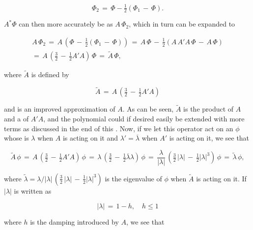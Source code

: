 \begin{equation}
\Phi_2 \,=\, \Phi - \tfrac{1}{2}(\Phi_1 \,-\, \Phi).
\end{equation}

$A^*\Phi$ can then more accurately be \approximated as $A\,\Phi_2$, which in turn can be expanded to

\begin{equation}
\begin{array}{c}
A\,\Phi_2 \,=\, A\,\left(\Phi \,-\, \tfrac{1}{2}(\Phi_1 \,-\, \Phi)\right) \,=\, A\,\Phi \,-\, \tfrac{1}{2}(A\,A'A\,\Phi \,-\, A\,\Phi) \\
=\, A\,\left(\tfrac{3}{2} \,-\, \tfrac{1}{2}A'A\right)\,\Phi \,=\, \tilde{A}\,\Phi,
\end{array}
\end{equation}

where $\tilde{A}$ is defined by

\begin{equation} \label{eq:compensated_advection_operator}
\tilde{A} \,=\, A\,\left(\tfrac{3}{2} \,-\, \tfrac{1}{2}A'A\right)
\end{equation}
 
and is an improved approximation of $A$. As can be seen, $\tilde{A}$ is the product of $A$ and a \polynomial of $A'A$, and the polynomial could if desired easily be extended with more terms as discussed in the end of this \levelname. Now, if we let this operator act on an \eigenfunction $\phi$ whose \eigenvalue is $\lambda$ when $A$ is acting on it and $\lambda' = \overline{\lambda}$ when $A'$ is acting on it, we see that 

\begin{equation}
\tilde{A}\,\phi \,=\, A\,\left(\tfrac{3}{2} \,-\, \tfrac{1}{2}A'A\right)\,\phi \,=\, \lambda\,\left(\tfrac{3}{2} \,-\, \tfrac{1}{2}\overline{\lambda}\lambda\right)\,\phi \,=\, \frac{\lambda}{|\lambda|}\,\left(\tfrac{3}{2}\,|\lambda| \,-\, \tfrac{1}{2}|\lambda|^3\right)\,\phi \,=\, \tilde{\lambda}\,\phi,
\end{equation}

where $\tilde{\lambda} = \lambda/|\lambda|\,\left(\tfrac{3}{2}\,|\lambda| \,-\, \tfrac{1}{2}|\lambda|^3\right)$ is the eigenvalue of $\phi$ when $\tilde{A}$ is acting on it. If $|\lambda|$ is written as

\begin{equation}
|\lambda| \,=\, 1 - h, \quad h \leq 1
\end{equation}

where $h$ is the damping introduced by $A$, we see that

